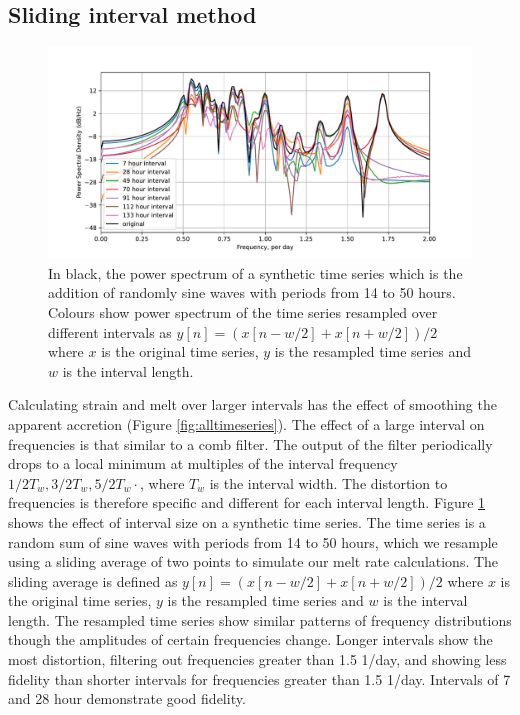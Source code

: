 \subsection{Sliding interval method}

\label{sec:synthetic}
\begin{figure}[!ht]
\centering
\includegraphics[width=1\textwidth]{chapters/3/synthetic.pdf}
\caption[]{In black, the power spectrum of a synthetic time series which is the addition of randomly sine waves with periods from 14 to 50 hours. Colours show power spectrum of the time series resampled over different intervals as $y[n] = (x[n-w/2]+x[n+w/2])/2$ where $x$ is the original time series, $y$ is the resampled time series and $w$ is the interval length.}
\label{fig:synthetic}
\end{figure}

Calculating strain and melt over larger intervals has the effect of smoothing the apparent accretion (Figure \ref{fig:alltimeseries}). The effect of a large interval on frequencies is that similar to a comb filter. The output of the filter periodically drops to a local minimum at multiples of the interval frequency $1 / 2T_w, 3 / 2T_w, 5 / 2T_w \cdot$, where $T_w$ is the interval width. The distortion to frequencies is therefore specific and different for each interval length. Figure \ref{fig:synthetic} shows the effect of interval size on a synthetic time series. The time series is a random sum of sine waves with periods from 14 to 50 hours, which we resample using a sliding average of two points to simulate our melt rate calculations. The sliding average is defined as $y[n] = (x[n-w/2]+x[n+w/2])/2$ where $x$ is the original time series, $y$ is the resampled time series and $w$ is the interval length. The resampled time series show similar patterns of frequency distributions though the amplitudes of certain frequencies change. Longer intervals show the most distortion, filtering out frequencies greater than 1.5 1/day, and showing less fidelity than shorter intervals for frequencies greater than 1.5 1/day. Intervals of 7 and 28 hour demonstrate good fidelity.

